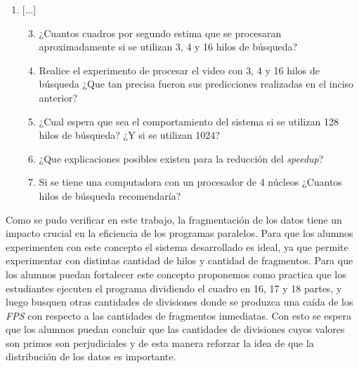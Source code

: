 \begin{enumerate}

	\item{[...]

\begin{enumerate}

	\setcounter{enumii}{2}

	\item{¿Cuantos cuadros por segundo estima que se procesaran
		aproximadamente si se utilizan 3, 4 y 16 hilos de búsqueda?}

	\item{Realice el experimento de procesar el video con 3, 4 y 16 hilos de
		búsqueda ¿Que tan precisa fueron sus predicciones realizadas en
		el inciso anterior?}

	\item{¿Cual espera que sea el comportamiento del sistema si se utilizan
		128 hilos de búsqueda? ¿Y si se utilizan 1024?}

	\item{¿Que explicaciones posibles existen para la reducción del
		\emph{speedup}?}

	\item{Si se tiene una computadora con un procesador de 4 núcleos
		¿Cuantos hilos de búsqueda recomendaría?}

\end{enumerate}}

\end{enumerate}

Como se pudo verificar en este trabajo, la fragmentación de los datos tiene un
impacto crucial en la eficiencia de los programas paralelos. Para que los
alumnos experimenten con este concepto el sistema desarrollado es ideal, ya que
permite experimentar con distintas cantidad de hilos y cantidad de fragmentos.
Para que los alumnos puedan fortalecer este concepto proponemos como practica
que los estudiantes ejecuten el programa dividiendo el cuadro en 16, 17 y 18
partes, y luego busquen otras cantidades de divisiones donde se produzca una
caída de los \emph{FPS} con respecto a las cantidades de fragmentos inmediatas.
Con esto se espera que los alumnos puedan concluir que las cantidades de
divisiones cuyos valores son primos son perjudiciales y de esta manera
reforzar la idea de que la distribución de los datos es importante.

